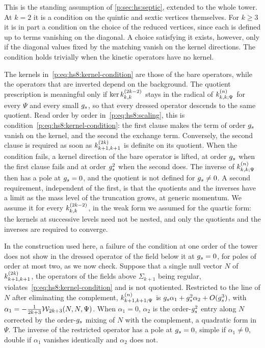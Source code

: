 This is the standing assumption of \cref{p:sec:hs:septic}, extended to the whole tower.
At $k = 2$ it is a condition on the quintic and sextic vertices themselves.
For $k \ge 3$ it is in part a condition on the choice of the reduced vertices, since each is defined up to terms vanishing on the diagonal.
  A choice satisfying it exists, however, only if the diagonal values fixed by the matching vanish on the kernel directions.
The condition holds trivially when the kinetic operators have no kernel.

The kernels in~\eqref{p:eq:hs8:kernel-condition} are those of the bare operators, while the operators that are inverted depend on the background.
The quotient prescription is meaningful only if $\ker \kin{k}{}{2 k - 2}$ stays in the radical of $\kin{k}{\Psi}{n}$ for every $\Psi$ and every small $g_s$, so that every dressed operator descends to the same quotient.
Read order by order in~\eqref{p:eq:hs8:scaling}, this is condition~\eqref{p:eq:hs8:kernel-condition}: the first clause makes the term of order $g_s$ vanish on the kernel, and the second the exchange term.
Conversely, the second clause is required as soon as $\kin{k + 1}{}{2 k}$ is definite on its quotient.
When the condition fails, a kernel direction of the bare operator is lifted, at order $g_s$ when the first clause fails and at order $g_s^2$ when the second does.
The inverse of $\kin{k}{\Psi}{n}$ then has a pole at $g_s = 0$, and the quotient is not defined for $g_s \neq 0$.
A second requirement, independent of the first, is that the quotients and the inverses have a limit as the mass level of the truncation grows, at generic momentum.
We assume it for every $\kin{k}{}{2 k - 2}$, in the weak form we assumed for the quartic form: the kernels at successive levels need not be nested, and only the quotients and the inverses are required to converge.

In the construction used here, a failure of the condition at one order of the tower does not show in the dressed operator of the field below it at $g_s = 0$, for poles of order at most two, as we now check.
Suppose that a single null vector $N$ of $\kin{k + 1}{}{2 k}$, the operators of the fields above $\Sigma_{k + 1}$ being regular, violates~\eqref{p:eq:hs8:kernel-condition} and is not quotiented.
Restricted to the line of $N$ after eliminating the complement, $\kin{k + 1}{\Psi}{n}$ is $g_s \alpha_1 + g_s^2 \alpha_2 + O(g_s^3)$, with $\alpha_1 = - \tfrac{1}{2 k + 3} \mathcal{W}_{2 k + 3}(N, N, \Psi)$.
When $\alpha_1 = 0$, $\alpha_2$ is the order-$g_s^2$ entry along $N$ corrected by the order-$g_s$ mixing of $N$ with the complement, a quadratic form in $\Psi$.
The inverse of the restricted operator has a pole at $g_s = 0$, simple if $\alpha_1 \neq 0$, double if $\alpha_1$ vanishes identically and $\alpha_2$ does not.

